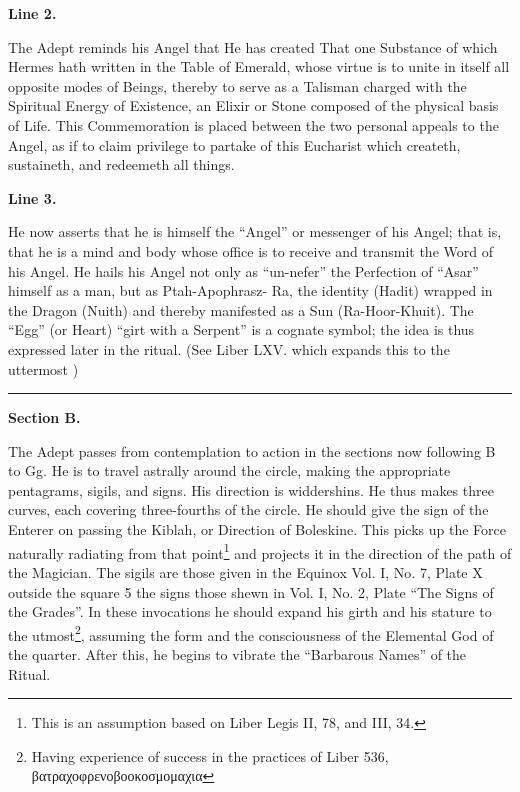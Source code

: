 \textbf{Line 2.}


The Adept reminds his Angel that He has created That one Substance of which Hermes hath written in the Table of Emerald, whose virtue is to unite in itself all opposite modes of Beings, thereby to serve as a Talisman charged with the Spiritual Energy of Existence, an Elixir or Stone composed of the physical basis of Life. This Commemoration is placed between the two personal appeals to the Angel, as if to claim privilege to partake of this Eucharist which createth, sustaineth, and redeemeth all things.


\textbf{Line 3.}

He now asserts that he is himself the \enquote{Angel} or messenger of his Angel; that is, that he is a mind and body whose office is to receive and transmit the Word of his Angel. He hails his Angel not only as \enquote{un-nefer} the Perfection of \enquote{Asar} himself as a man, but as Ptah-Apophrasz- Ra, the identity (Hadit) wrapped in the Dragon (Nuith) and thereby manifested as a Sun (Ra-Hoor-Khuit). The \enquote{Egg} (or Heart) \enquote{girt with a Serpent} is a cognate symbol; the idea is thus expressed later in the ritual. (See Liber LXV. which expands this to the uttermost )

{\centering
\rule{1in}{0.5pt}
\par}

\pagebreak[1]
\textbf{Section B.}

The Adept passes from contemplation to action in the sections now following B to Gg. He is to travel astrally around the circle, making the appropriate pentagrams, sigils, and signs. His direction is widdershins. He thus makes three curves, each covering three-fourths of the circle. He should give the sign of the Enterer on passing the Kiblah, or Direction of Boleskine. This picks up the Force naturally radiating from that point\footnote{This is an assumption based on Liber Legis II, 78, and III, 34.} and projects it in the direction of the path of the Magician. The sigils are those given in the Equinox Vol. I, No. 7, Plate X outside the square 5 the signs those shewn in Vol. I, No. 2, Plate \enquote{The Signs of the Grades}. In these invocations he should expand his girth and his stature to the utmost\footnote{Having experience of success in the practices of Liber 536, \textgreek{βατραχοφρενοβοοκοσμομαχια}\footnotemark}, assuming the form and the consciousness of the Elemental God of the quarter. After this, he begins to vibrate the \enquote{Barbarous Names} of the Ritual.


